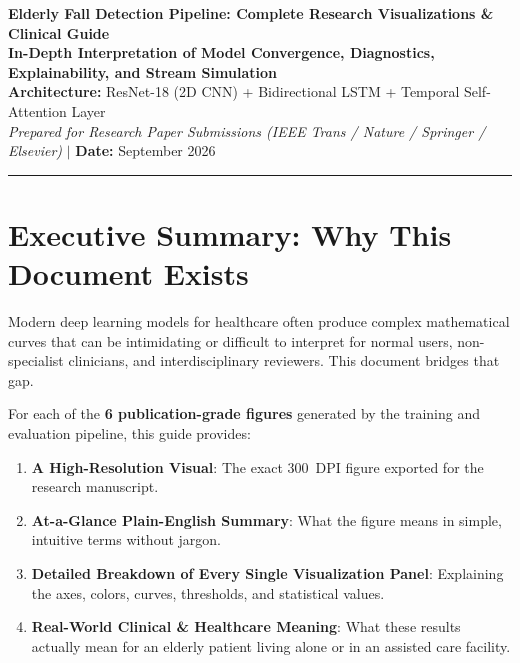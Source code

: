 \documentclass[11pt,a4paper]{article}
\begin{document}
\begin{center}
    {\LARGE \textbf{\color{primaryblue}Elderly Fall Detection Pipeline: Complete Research Visualizations \& Clinical Guide}}\\[0.4cm]
    {\large \textbf{In-Depth Interpretation of Model Convergence, Diagnostics, Explainability, and Stream Simulation}}\\[0.3cm]
    {\normalsize \textbf{Architecture:} ResNet-18 (2D CNN) + Bidirectional LSTM + Temporal Self-Attention Layer}\\[0.2cm]
    {\small \textit{Prepared for Research Paper Submissions (IEEE Trans / Nature / Springer / Elsevier)} \quad $\vert$ \quad \textbf{Date:} September 2026}\\[0.4cm]
    \noindent\rule{\textwidth}{1.2pt}
\end{center}

\vspace{-0.2cm}

\section*{Executive Summary: Why This Document Exists}
Modern deep learning models for healthcare often produce complex mathematical curves that can be intimidating or difficult to interpret for normal users, non-specialist clinicians, and interdisciplinary reviewers. This document bridges that gap. 

For each of the \textbf{6 publication-grade figures} generated by the training and evaluation pipeline, this guide provides:
\begin{enumerate}
    \item \textbf{A High-Resolution Visual}: The exact 300~DPI figure exported for the research manuscript.
    \item \textbf{At-a-Glance Plain-English Summary}: What the figure means in simple, intuitive terms without jargon.
    \item \textbf{Detailed Breakdown of Every Single Visualization Panel}: Explaining the axes, colors, curves, thresholds, and statistical values.
    \item \textbf{Real-World Clinical \& Healthcare Meaning}: What these results actually mean for an elderly patient living alone or in an assisted care facility.
\end{enumerate}

\vspace{0.3cm}
\end{document}
